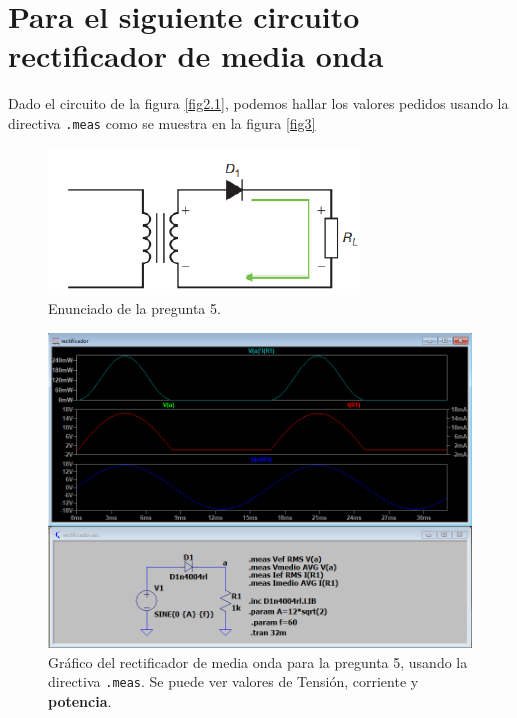 \documentclass[a4paper]{article} %
\begin{document}
\section{Para el siguiente circuito rectificador de media onda}

Dado el circuito de la figura \eqref{fig2.1}, podemos hallar los valores pedidos usando la directiva \texttt{.meas} como se muestra en la figura \eqref{fig3}

\begin{figure} %
	\centering %
	\includegraphics[scale=0.8]{IMAGENES/fig2.1} %
	\caption{Enunciado de la pregunta 5.} %
	\label{fig2.1} %
\end{figure} %

\begin{figure} %
	\centering %
	\includegraphics[scale=0.5]{IMAGENES/fig3} %
	\caption{Gráfico del rectificador de media onda para la pregunta 5, usando la directiva \texttt{.meas}. Se puede ver valores de Tensión, corriente y \textbf{potencia}.} %
	\label{fig3} %
\end{figure} %
\end{document}
